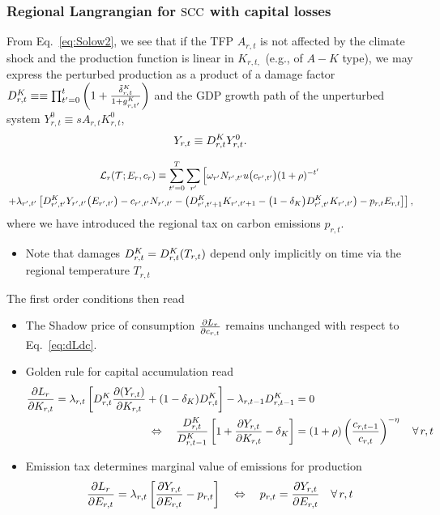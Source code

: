 \documentclass[preprint,3p,authoryear]{elsarticle}
\begin{document}
 \subsubsection{Regional Langrangian for $\operatorname{SCC}$ with capital losses}
\label{sec:LKAreg}
From Eq.~\eqref{eq:Solow2}, we see that if the TFP $A_{r,t}$ is not affected by the climate shock and the production function is linear in $K_{r,t,}$ (e.g., of $A-K$ type), we may express the perturbed production as a product of a damage factor $D^K_{r,t}\equiv\equiv\prod_{t'=0}^{t}\left(1+\frac{\tilde{\delta}^K_{r,t}}{1+g^{K}_{r,t'}}\right)$ and the GDP growth path of the unperturbed system $Y^{0}_{r,t}\equiv s A_{r,t}K_{r,t}^0$,
\begin{equation}
  \label{eq:GDP2}
  Y_{r,t}\equiv D^K_{r,t}Y^{0}_{r,t}.
\end{equation}

\begin{multline}
  \label{eq:LKAreg} \mathcal{L}_r(\mathcal{T};E_r,c_r)\equiv\sum_{t'=0}^{T}\sum_{r'}\left[\omega_{r'}N_{r',t'}u\big(c_{r',t'}\big)(1+\rho)^{-t'}\right.\\
  \left.+\lambda_{r',t'}\left[D^K_{r',t'}Y_{r',t'}\big(E_{r',t'}\big) -c_{r',t'}N_{r',t'}-\left(D^K_{r',t'+1}K_{r',t'+1}-\big(1-\delta_K\big)D^K_{r',t'}K_{r',t'}\right)-p_{r,t}E_{r,t} \right]\right],
\end{multline}
where we have introduced the regional tax on carbon emissions $p_{r,t}$.
\begin{itemize}
\item Note that damages $D^K_{r,t}=D^K_{r,t}(T_{r,t})$ depend only implicitly on time via the regional temperature $T_{r,t}$
\end{itemize}
The first order conditions then read
\begin{itemize}
\item The Shadow price of consumption $\frac{\partial L_r}{\partial c_{r,t}}$ remains unchanged with respect to Eq.~\eqref{eq:dLdc}.

\item Golden rule for capital accumulation read
  \begin{align} \frac{\partial L_r}{\partial K_{r,t}}=\lambda_{r,t}\left[D^K_{r,t}\frac{\partial(Y_{r,t})}{\partial K_{r,t}}+(1-\delta_K)D^K_{r,t}\right]-\lambda_{r,t-1}D^K_{r,t-1}&= 0\notag\\
    \Leftrightarrow\quad \frac{D^K_{r,t}}{D^K_{r,t-1}}\left[1+\frac{\partial Y_{r,t}}{\partial K_{r,t}}-\delta_K\right] &= (1+\rho)\left(\frac{c_{r,t-1}}{c_{r,t}}\right)^{-\eta}\quad\forall\, r,t \label{eq:dLdK}
  \end{align}
\item Emission tax determines marginal value of emissions for production  
  \begin{equation}
    \label{eq:dLdE} \frac{\partial L_r}{\partial E_{r,t}}=\lambda_{r,t}\left[\frac{\partial Y_{r,t}}{\partial E_{r,t}}-p_{r,t}\right]\quad\Leftrightarrow\quad p_{r,t}=\frac{\partial Y_{r,t}}{\partial E_{r,t}} \quad\forall\,r,t 
  \end{equation}
\end{itemize}
\end{document}
